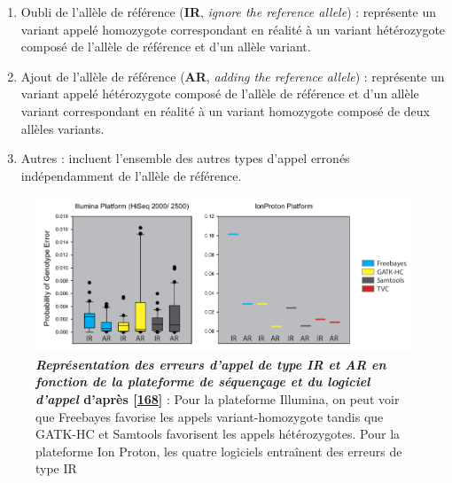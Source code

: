 \documentclass[12pt,a4paper,twoside]{ugathesis}
\theoremstyle{definition}
\theoremstyle{definition}
\theoremstyle{definition}
\theoremstyle{remark}
\begin{document}
\begin{enumerate}
\def\labelenumi{\arabic{enumi}.}
\item
  Oubli de l'allèle de référence (\textbf{IR}, \emph{ignore the
  reference allele}) : représente un variant appelé homozygote
  correspondant en réalité à un variant hétérozygote composé de l'allèle
  de référence et d'un allèle variant.
\item
  Ajout de l'allèle de référence (\textbf{AR}, \emph{adding the
  reference allele}) : représente un variant appelé hétérozygote composé
  de l'allèle de référence et d'un allèle variant correspondant en
  réalité à un variant homozygote composé de deux allèles variants.
\item
  Autres : incluent l'ensemble des autres types d'appel erronés
  indépendamment de l'allèle de référence.
\end{enumerate}

\newpage

\begin{figure}

{\centering \includegraphics[scale=.37]{figure/snp_error_type} 

}

\caption[Représentation des erreurs d'appel de type IR et AR en fonction de la plateforme de séquençage et du logiciel d'appel]{\textbf{\emph{Représentation des erreurs d'appel de
type IR et AR en fonction de la plateforme de séquençage et du logiciel
d'appel} d'après {[}\protect\hyperlink{ref-Hwang2015}{168}{]}} : Pour la
plateforme Illumina, on peut voir que Freebayes favorise les appels
variant-homozygote tandis que GATK-HC et Samtools favorisent les appels
hétérozygotes. Pour la plateforme Ion Proton, les quatre logiciels
entraînent des erreurs de type IR}\label{fig:pictsnperror}
\end{figure}
\end{document}

